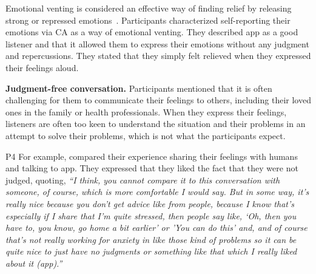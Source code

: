     
    
    Emotional venting is considered an effective way of finding relief by releasing strong or repressed emotions~\cite{bennett1991irrationality, tonnaer2020explosive, leslie2008boxing}. 
    Participants characterized self-reporting their emotions via \ac{CA} as a way of emotional venting. 
    They described \acl{app} as a good listener and that it allowed them to express their emotions without any judgment and repercussions.
    They stated that they simply felt relieved when they expressed their feelings aloud.
    



        \textbf{ Judgment-free conversation. }
        Participants mentioned that it is often challenging for them to communicate their feelings to others, including their loved ones in the family or health professionals. When they express their feelings, listeners are often too keen to understand the situation and their problems in an attempt to solve their problems, which is not what the participants expect.
        
            P4 For example, compared their experience sharing their feelings with humans and talking to \acl{app}. They expressed that they liked the fact that they were not judged, quoting,
                \textit{``I think, you cannot compare it to this conversation with someone, of course, which is more comfortable I would say. But in some way, it's really nice because you don't get advice like from people, because I know that's especially if I share that I'm quite stressed, then people say like, `Oh, then you have to, you know, go home a bit earlier' or 'You can do this' and, and of course that's not really working for anxiety in like those kind of problems so it can be quite nice to just have no judgments or something like that which I really liked about it (\acl{app}).''}
        
